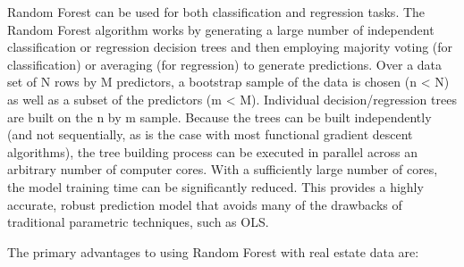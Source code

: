 \documentclass[]{article}
\begin{document}
Random Forest can be used for both classification and regression tasks.
The Random Forest algorithm works by generating a large number of
independent classification or regression decision trees and then
employing majority voting (for classification) or averaging (for
regression) to generate predictions. Over a data set of N rows by M
predictors, a bootstrap sample of the data is chosen (n \textless{} N)
as well as a subset of the predictors (m \textless{} M). Individual
decision/regression trees are built on the n by m sample. Because the
trees can be built independently (and not sequentially, as is the case
with most functional gradient descent algorithms), the tree building
process can be executed in parallel across an arbitrary number of
computer cores. With a sufficiently large number of cores, the model
training time can be significantly reduced. This provides a highly
accurate, robust prediction model that avoids many of the drawbacks of
traditional parametric techniques, such as OLS.

The primary advantages to using Random Forest with real estate data are:
\end{document}
